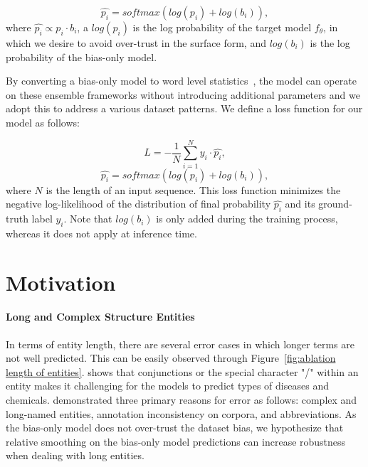 \documentclass[11pt]{article}
\begin{document}
\begin{equation}
    \hat{p_{i}} = softmax(log(p_i) + log(b_i)),
\end{equation}
where $\hat{p_i} \propto p_i \cdot b_i$, a $log(p_i)$ is the log probability of the target model $f_\theta$, in which we desire to avoid over-trust in the surface form, and $log(b_i)$ is the log probability of the bias-only model.



By converting a bias-only model to word level  statistics~\cite{ko2020look, kim2021your}, the model can operate on these ensemble frameworks without introducing additional parameters and we adopt this to address a various dataset patterns.
We define a loss function for our model as follows:

\begin{equation}
    L = -\frac{1}{N}\sum_{i=1}^{N} y_{i} \cdot \hat{p_i},
\end{equation}
\begin{equation}
    \hat{p_i} = softmax(log(p_i) + log(b_i)), 
\end{equation}
where $N$ is the length of an input sequence.
This loss function minimizes the negative log-likelihood of the distribution of final probability $\hat{p_i}$ and its ground-truth label $y_i$.
Note that $log(b_i)$ is only added during the training process, whereas it does not apply at inference time.



\section{Motivation}

\paragraph{Long and Complex Structure Entities}
\label{sec:longnamed}
In terms of entity length, there are several error cases in which longer terms are not well predicted.
This can be easily observed through Figure~\ref{fig:ablation length of entities}.
\citet{hong2020dtranner} shows that conjunctions or the special character "/" within an entity makes it challenging for the models to predict types of diseases and chemicals.
\citet{wei2020multichannel} demonstrated three primary reasons for error as follows: complex and long-named entities, annotation inconsistency on corpora, and abbreviations.
As the bias-only model does not over-trust the dataset bias, we hypothesize that relative smoothing on the bias-only model predictions can increase robustness when dealing with long entities.
\end{document}
